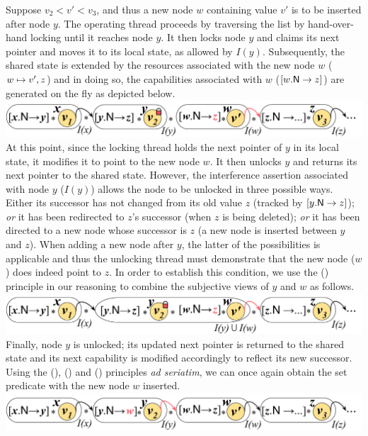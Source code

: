 Suppose $v_2 < v' < v_3$, and thus a new node $w$ containing value $v'$ is to be inserted after node $y$.  The operating thread proceeds by traversing the list by hand-over-hand locking until it reaches node $y$. It then locks node $y$ and claims its next pointer and moves it to its local state, as allowed by $I(y)$. Subsequently, the shared state is extended by the resources associated with the new node $w$ ($w \mapsto v', z$) and in doing so, the capabilities associated with $w$ ($\nextC{w}{z}$) are generated on the fly as depicted below.\\
%
\includegraphics[scale=0.215]{Sections/FurtherExamples/Images/add1.pdf}\\
%
At this point, since the locking thread holds the next pointer of $y$ in its local state, it modifies it to point to the new node $w$. It then unlocks $y$ and returns its next pointer to the shared state. However, the interference assertion associated with node $y$ ($I(y)$) allows the node to be unlocked in three possible ways. Either its successor has not changed from its old value $z$ (tracked by $\nextC{y}{z}$); \emph{or} it has been redirected to $z$'s successor (when $z$ is being deleted); \emph{or} it has been directed to a new node whose successor is $z$ (a new node is inserted between $y$ and $z$). When adding a new node after $y$, the latter of the possibilities is applicable and thus the unlocking thread must demonstrate that the new node ($w$) does indeed point to $z$. In order to establish this condition, we use the (\mergeRule) principle in our reasoning to combine the subjective views of $y$ and $w$ as follows.\\
%
\includegraphics[scale=0.215]{Sections/FurtherExamples/Images/add2.pdf}\\
%
Finally, node $y$ is unlocked; its updated next pointer is returned to the shared state and its next capability is modified accordingly to reflect its new successor. Using the (\copyRule), (\forgetRule) and (\shiftRule) principles \textit{ad seriatim}, we can once again obtain the set predicate with the new node $w$ inserted. \\
%
\includegraphics[scale=0.215]{Sections/FurtherExamples/Images/add3.pdf}
%

